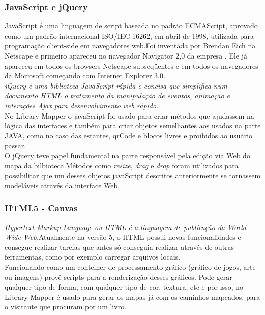 \documentclass[a4paper,10pt]{article}
\begin{document}
	\subsubsection{JavaScript e jQuery}
	 JavaScript é uma linguagem de script baseada no padrão ECMAScript, aprovado como um padrão internacional ISO/IEC 16262, em abril de 1998,
	 utilizada para programação client-side em navegadores web.Foi inventada por Brendan Eich na Netscape e primeiro
	apareceu no navegador Navigator 2,0 da empresa . Ele já apareceu em todos os browsers Netscape subseqüentes e em todos os navegadores da Microsoft começando com Internet Explorer 
	3.0.\cite{javascript}\\

	{\it jQuery é uma biblioteca JavaScript rápida e concisa que simplifica num documento HTML o tratamento da manipulação de eventos, animação
	 e interações Ajax para desenvolvimento web rápido.}\cite{jquery} \\
	
	No Library Mapper o javaScript foi usado para criar métodos que ajudassem na lógica das interfaces e também para criar objetos
	semelhantes aos usados na parte JAVA, como no caso das estantes, qrCode e blocos livres e proibidos ao usuário passar.\\
	 
	O jQuery teve papel fundamental na parte responsável pela edição via Web do mapa da bilbioteca.Métodos como {\it resize}, {\it drag} e {\it drop}
	foram utilizados para possibilitar que um desses objetos javaScript descritos anteriormente se tornassem modeláveis através da interface Web.     

	\subsubsection{HTML5 - Canvas}
	{\it Hypertext Markup Language ou HTML é a linguagem de publicação da World Wide Web.}\cite{html}Atualmente na versão 5, o HTML
	possui novas funcionalidades e consegue realizar tarefas que antes só conseguia realizar através de outras ferramentas, como por exemplo
	carregar arquivos locais.\\

	Funcionando como um conteiner de processamento gráfico (gráfico de jogos, arte ou imagens) provê scripts para a renderização desses gráficos.
	Pode gerar qualquer tipo de forma, com qualquer tipo de cor, textura, etc e por isso, no Library Mapper é usado para gerar os mapas
	já com os caminhos mapeados, para o visitante que procuram por um livro.\\
\end{document}
